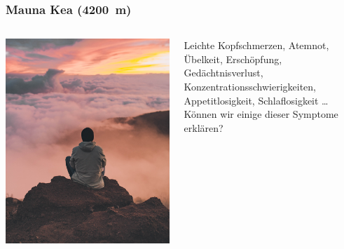 \documentclass{beamer}
\begin{document}
\begin{frame}
\frametitle{Mauna Kea (\SI{4200}{\meter})}

\begin{columns}[c]

\begin{column}{5cm}

\begin{center}

\includegraphics[width=\textwidth]{maunakea.jpg}

\end{center}

\end{column}

\begin{column}{5cm}

Leichte Kopfschmerzen, Atemnot, Übelkeit, Erschöpfung, Gedächtnisverlust, Konzentrationsschwierigkeiten, Appetitlosigkeit, Schlaflosigkeit \dots $\,$\\[0.5 cm]

Können wir einige dieser Symptome erklären?

\end{column}

\end{columns}

\end{frame}
\end{document}
